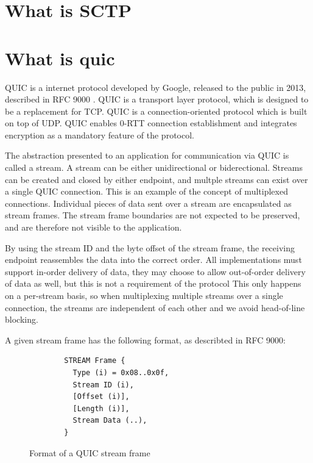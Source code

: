 \section{What is SCTP}

\section{What is quic}

QUIC is a internet protocol developed by Google, released to the
public in 2013, described in RFC 9000
\cite{iyengarQUICUDPBasedMultiplexed2021}. QUIC is a transport
layer protocol, which is designed to be a replacement for TCP.
QUIC is a connection-oriented protocol which is built on top of
UDP. QUIC enables 0-RTT connection establishment and integrates
encryption as a mandatory feature of the protocol.

The abstraction presented to an application for communication
via QUIC is called a stream. A stream can be either
unidirectional or biderectional. Streams can be created and
closed by either endpoint, and multple streams can exist over a
single QUIC connection. This is an example of the concept of
multiplexed connections. Individual pieces of data sent over a
stream are encapsulated as stream frames. The stream frame boundaries
are not expected to be preserved, and are therefore not visible
to the application. 

By using the stream ID and the byte offset of the stream frame,
the receiving endpoint reassembles the data into the correct
order. All implementations must support in-order delivery of
data, they may choose to allow out-of-order delivery of data as
well, but this is not a requirement of the protocol This only
happens on a per-stream basis, so when multiplexing multiple
streams over a single connection, the streams are independent of
each other and we avoid head-of-line blocking.

A given stream frame has the following format, as describted in
RFC 9000:

\begin{figure}[H]
	\centering
	\begin{lstlisting}
        STREAM Frame {
          Type (i) = 0x08..0x0f,
          Stream ID (i),
          [Offset (i)],
          [Length (i)],
          Stream Data (..),
        }
    \end{lstlisting}
	\caption{Format of a QUIC stream frame \cite{iyengarQUICUDPBasedMultiplexed2021}}
	\label{fig:stream_frame_format}
\end{figure}

